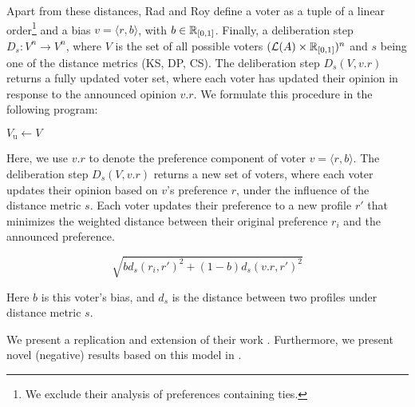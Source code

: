 Apart from these distances, Rad and Roy define a voter as a tuple of a linear
order\footnote{We exclude their analysis of preferences containing ties.} and a
bias \(v = \langle r, b \rangle\), with \( b \in \mathbb{R}_{[0,1]}\). Finally, a
deliberation step \(D_{s} : V^n \to V^n\), where $V$ is the set of all possible
voters $ (\mathcal{L}(A) \times \mathbb{R}_{[0,1]})^n$ and $s$ being one of
the distance metrics (KS, DP, CS). The deliberation step $D_s(V, v.r)$ returns a fully
updated voter set, where each voter has updated their opinion in response to
the announced opinion $v.r$. We formulate this procedure in the following
program:

\IncMargin{1em}
\begin{algorithm}[H]

	\BlankLine

	$V_{\text{u}} \gets V$ \\

\end{algorithm}
\DecMargin{1em}


Here, we use $v.r$ to denote the preference component of voter $v = \langle r, b \rangle$.
The deliberation step $D_s(V, v.r)$ returns a new set of voters, where each voter updates
their opinion based on $v$'s preference $r$, under the influence of the distance metric $s$. Each voter updates their preference to a new profile $r'$ that minimizes the weighted distance between their original preference $r_i$ and the announced preference.


\begin{equation}
	\sqrt{
		b d_s(r_i, r')^2 + (1-b)d_s(v.r, r')^2
	}
	\label{eq:deliberation_step_formula}
\end{equation}

Here $b$ is this voter's bias, and $d_s$ is the distance between two profiles
under distance metric $s$.

We present a replication and extension of their work .
Furthermore, we present novel (negative) results based on this model in
.


